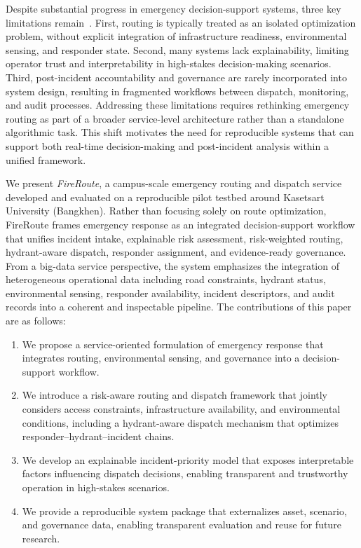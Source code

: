Despite substantial progress in emergency decision-support systems, three key limitations remain~\cite{sarkar2022}. First, routing is typically treated as an isolated optimization problem, without explicit integration of infrastructure readiness, environmental sensing, and responder state. Second, many systems lack explainability, limiting operator trust and interpretability in high-stakes decision-making scenarios. Third, post-incident accountability and governance are rarely incorporated into system design, resulting in fragmented workflows between dispatch, monitoring, and audit processes. Addressing these limitations requires rethinking emergency routing as part of a broader service-level architecture rather than a standalone algorithmic task. This shift motivates the need for  reproducible systems that can support both real-time decision-making and post-incident analysis within a unified framework.

We present \textit{FireRoute}, a campus-scale emergency routing and dispatch service developed and evaluated on a reproducible pilot testbed around Kasetsart University (Bangkhen). Rather than focusing solely on route optimization, FireRoute frames emergency response as an integrated decision-support workflow that unifies incident intake, explainable risk assessment, risk-weighted routing, hydrant-aware dispatch, responder assignment, and evidence-ready governance. From a big-data service perspective, the system emphasizes the integration of heterogeneous operational data including road constraints, hydrant status, environmental sensing, responder availability, incident descriptors, and audit records into a coherent and inspectable pipeline. The contributions of this paper are as follows:

\begin{enumerate}
    \item We propose a service-oriented formulation of emergency response that integrates routing, environmental sensing, and governance into a decision-support workflow.

    \item We introduce a risk-aware routing and dispatch framework that jointly considers access constraints, infrastructure availability, and environmental conditions, including a hydrant-aware dispatch mechanism that optimizes responder--hydrant--incident chains.

    \item We develop an explainable incident-priority model that exposes interpretable factors influencing dispatch decisions, enabling transparent and trustworthy operation in high-stakes scenarios.

    \item We provide a reproducible system package that externalizes asset, scenario, and governance data, enabling transparent evaluation and reuse for future research.
\end{enumerate}

